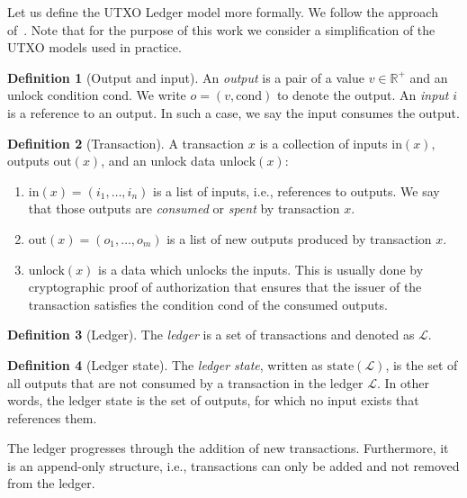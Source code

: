 \documentclass[11pt]{article}
\newcommand{\weight}{v}
\newcommand{\cond}{\mathrm{cond}}
\newcommand{\unlock}{\mathrm{unlock}}
\newcommand{\state}{\mathrm{state}}
\newcommand{\inputs}{\mathrm{in}}
\newcommand{\outputs}{\mathrm{out}}
\newcommand{\ledger}{\mathcal{L}}
\theoremstyle{plain}
\theoremstyle{definition}
\newtheorem{definition}{Definition}
\numberwithin{definition}{section}
\numberwithin{lemma}{section}
\numberwithin{ass}{section}
\numberwithin{remark}{section}
\numberwithin{example}{section}
\numberwithin{proposition}{section}
\numberwithin{theorem}{section}
\begin{document}
Let us define the UTXO Ledger model more formally. We follow the approach of~\cite{IOTASC}. Note that for the purpose of this work we consider a simplification of the UTXO models used in practice.
\begin{definition}[Output and input]
An \textit{output} is a pair of a value $\weight\in \mathbb{R}^+$ and an unlock condition $\cond$. We write $o=(\weight, \cond)$ to denote the output. An \textit{input} $i$ is a reference to an output. In such a case, we say the input consumes the output. 
\end{definition}

\begin{definition}[Transaction]\label{def: transaction}
A transaction $x$ is a collection of inputs $\inputs(x),$ outputs $\outputs(x)$, and an unlock data $\unlock(x)$:
\begin{enumerate}[leftmargin=*]
    \item $\inputs(x)=(i_1,\ldots, i_n)$ is a list of inputs, i.e., references to outputs. We say that those outputs are \textit{consumed} or \textit{spent} by transaction $x$.
    \item $\outputs(x)=(o_1,\ldots, o_m)$ is a list of new outputs produced by transaction $x$.
    \item $\unlock(x)$ is a data which unlocks the inputs. This is usually done by cryptographic proof of authorization that ensures that the issuer of the transaction satisfies the condition $\cond$ of the consumed outputs.
\end{enumerate}
\end{definition}

\begin{definition}[Ledger]\label{def: ledger}
The \emph{ledger} is a set of transactions and denoted as $\ledger$. 
\end{definition}

\begin{definition}[Ledger state]\label{def: ledger state}
The \emph{ledger state}, written as $\state(\ledger)$, is the set of all outputs that are not consumed by a transaction in the ledger $\ledger$. In other words, the ledger state is the set of outputs, for which no input exists that references them.
\end{definition}


The ledger progresses through the addition of new transactions. Furthermore, it is an append-only structure, i.e., transactions can only be added and not removed from the ledger.
\end{document}
